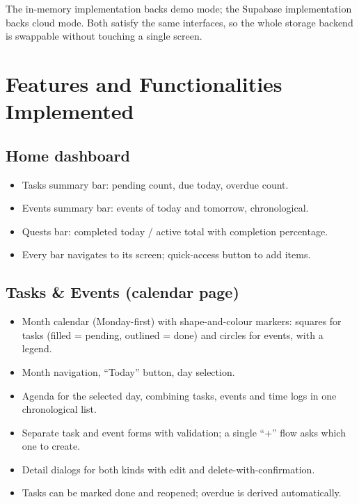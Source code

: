 \documentclass[12pt,a4paper]{article}
\begin{document}
The in-memory implementation backs demo mode; the Supabase implementation
backs cloud mode. Both satisfy the same interfaces, so the whole storage
backend is swappable without touching a single screen.

\section{Features and Functionalities Implemented}

\subsection{Home dashboard}
\begin{itemize}
  \item Tasks summary bar: pending count, due today, overdue count.
  \item Events summary bar: events of today and tomorrow, chronological.
  \item Quests bar: completed today / active total with completion percentage.
  \item Every bar navigates to its screen; quick-access button to add items.
\end{itemize}

\subsection{Tasks \& Events (calendar page)}
\begin{itemize}
  \item Month calendar (Monday-first) with shape-and-colour markers:
        squares for tasks (filled = pending, outlined = done) and circles
        for events, with a legend.
  \item Month navigation, ``Today'' button, day selection.
  \item Agenda for the selected day, combining tasks, events and time logs
        in one chronological list.
  \item Separate task and event forms with validation; a single ``+'' flow
        asks which one to create.
  \item Detail dialogs for both kinds with edit and delete-with-confirmation.
  \item Tasks can be marked done and reopened; overdue is derived
        automatically.
\end{itemize}
\end{document}
